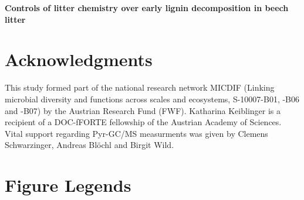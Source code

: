 \documentclass[10pt]{article}
\date{}
\begin{document}
\begin{flushleft}
{\Large
\textbf{Controls of litter chemistry over early lignin decomposition in beech litter}
}
\\

\newpage


\linenumbers %
\newpage%





\section*{Acknowledgments}
This study formed part of the national research network MICDIF (Linking microbial diversity and functions across scales and ecosystems, S-10007-B01, -B06 and -B07) by the Austrian Research Fund (FWF). Katharina Keiblinger is a recipient of a DOC-fFORTE fellowship of the Austrian Academy of Sciences. Vital support regarding Pyr-GC/MS measurments was given by Clemens Schwarzinger, Andreas Bl\"{o}chl and Birgit Wild.



\section*{Figure Legends}


\end{flushleft}
\end{document}
